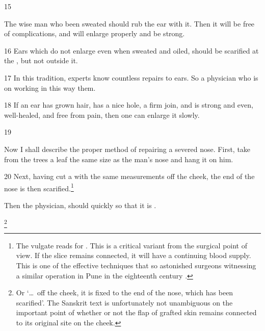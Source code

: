 \begin{translation}
    \item[15]%
    \begin{sloka}
        
        The wise man who been sweated should rub the  ear with 
        it. 
        Then it will be free of complications, and will enlarge properly and be strong.
    \end{sloka}
    
    \item[16]
    Ears which do not enlarge even when sweated and oiled, 
    should be scarified
    at the , but not outside it.  
    
    
    \item[17]
    In this tradition, experts know countless repairs to ears.  So a 
    physician who is  on working in this way 
     them.
    
    \item[18]
    If an ear has grown hair, has a nice hole, a firm join, and is strong and
    even, well-healed, and free from pain, then one can enlarge it slowly.
    
    
    \item[19]
    
    Now I shall describe the proper method of repairing a severed nose.
    First, take from the trees a leaf the same size as the man's nose and hang it
    on him. 
    
    \item[20] Next, having cut a  with the same
    measurements off the cheek, the end of the nose is then scarified.\footnote{The
    vulgate reads  for .
    This is a critical variant from the surgical point of view.  If the slice remains
    connected, it will have a continuing blood supply.  This is one of the effective 
    techniques that so astonished surgeons witnessing a similar operation in Pune in
    the eighteenth century \citep[see][67--70]{wuja-roots3}.}
    
    Then the  physician, 
    should quickly  so that it is 
    .
    
    
    \footnote{Or
    `\ldots\ off the cheek, it is fixed to the end of the nose, which has been
    scarified'. The Sanskrit text is unfortunately not unambiguous on the
    important point of whether or not the flap of grafted skin remains connected
    to its original site on the cheek.} 
    

\end{translation}
